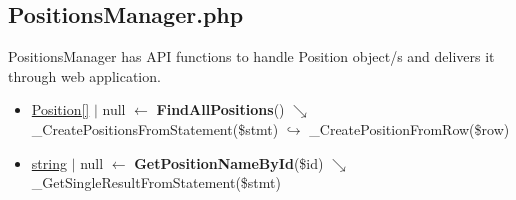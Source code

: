 \subsection{PositionsManager.php}
PositionsManager has API functions to handle Position object/s and delivers it through web application.
\begin{itemize}
  \setlength\itemsep{0em}
  \item \underline{Position[]} $\vert$ null $\leftarrow$  \textbf{FindAllPositions}()
  \newline    $\searrow$ \_CreatePositionsFromStatement(\$stmt)
  \newline    $\hookrightarrow$ \_CreatePositionFromRow(\$row)
  \item \underline{string} $\vert$ null $\leftarrow$ \textbf{GetPositionNameById}(\$id)
  \newline    $\searrow$ \_GetSingleResultFromStatement(\$stmt)
\end{itemize}
\newpage

